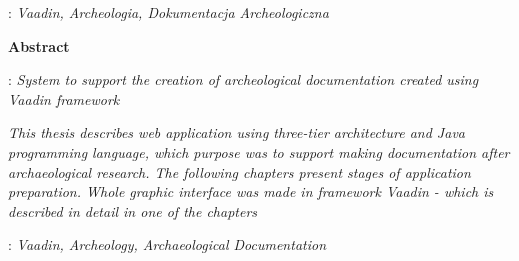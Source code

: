 \begin{titlepage}
    : {\itshape Vaadin, Archeologia, Dokumentacja Archeologiczna}
    \par
    \vspace{4\baselineskip}
    \begin{center}
	{\large\bfseries Abstract}\par\bigskip
    \end{center}
    : {\itshape 
	System to support the creation of archeological documentation created using Vaadin framework}\par
    \vspace*{1\baselineskip}
    {\itshape
    This thesis describes web application using three-tier architecture and Java programming language, which purpose was to support making documentation after archaeological research. The following chapters present stages of application preparation. Whole graphic interface was made in framework Vaadin - which is described in detail in one of the chapters}
    \vspace*{1\baselineskip}

    : {\itshape Vaadin, Archeology, Archaeological Documentation}

\end{titlepage}

